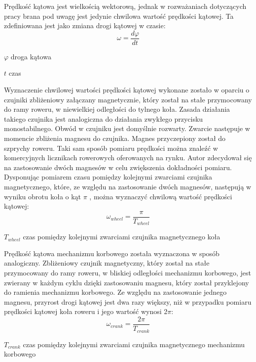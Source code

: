 Prędkość kątowa jest wielkością wektorową, jednak w rozważaniach dotyczących pracy brana pod uwagę jest jedynie chwilowa wartość prędkości kątowej. Ta zdefiniowana jest jako zmiana drogi kątowej w czasie:
\begin{equation}
    \omega = \frac{d\varphi}{dt}
    \label{eq:predkoscKatowa}
\end{equation}
\begin{eqwhere}[2cm]
	\item[$\varphi$] droga kątowa
	\item[$t$] czas
\end{eqwhere}
Wyznaczenie chwilowej wartości prędkości kątowej wykonane zostało w oparciu o czujniki zbliżeniowy załączany magnetycznie, który został na stałe przymocowany do ramy roweru, w niewielkiej odległości do tylnego koła. Zasada działania takiego czujnika jest analogiczna do działania zwykłego przycisku monostabilnego. Obwód w czujniku jest domyślnie rozwarty. Zwarcie następuje w momencie zbliżenia magnesu do czujnika. Magnes przyczepiony został do szprychy roweru. Taki sam sposób pomiaru prędkości można znaleźć w komercyjnych licznikach rowerowych oferowanych na rynku. Autor zdecydował się na zastosowanie dwóch magnesów w celu zwiększenia dokładności pomiaru. Dysponując pomiarem czasu pomiędzy kolejnymi zwarciami czujnika magnetycznego, które, ze względu na zastosowanie dwóch magnesów, następują w wyniku obrotu koła o kąt $\pi$ , można wyznaczyć chwilową wartość prędkości kątowej: 
\begin{equation}
    \omega_{wheel} = \frac{\pi}{T_{wheel}}
\end{equation}
\begin{eqwhere}[2cm]
	\item[$T_{wheel}$] czas pomiędzy kolejnymi zwarciami czujnika magnetycznego koła
\end{eqwhere}
Prędkość kątowa mechanizmu korbowego została wyznaczona w sposób analogiczny. Zbliżeniowy czujnik magnetyczny, który został na stałe przymocowany do ramy roweru, w bliskiej odległości mechanizmu korbowego, jest zwierany w każdym cyklu dzięki zastosowaniu magnesu, który został przyklejony do ramienia mechanizmu korbowego. Ze względu na zastosowanie jednego magnesu, przyrost drogi kątowej jest dwa razy większy, niż w przypadku pomiaru prędkości kątowej koła roweru i jego wartość wynosi 2$\pi$:
\begin{equation}
    \omega_{crank} = \frac{2\pi}{T_{crank}}
\end{equation}
\begin{eqwhere}[2cm]
	\item[$T_{crank}$] czas pomiędzy kolejnymi zwarciami czujnika magnetycznego mechanizmu korbowego
\end{eqwhere}
